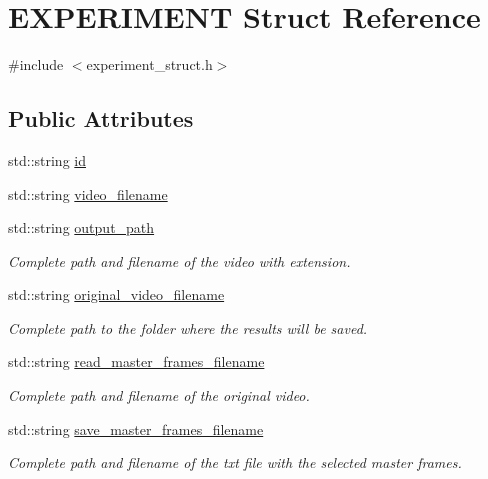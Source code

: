 \hypertarget{structEXPERIMENT}{}\section{E\+X\+P\+E\+R\+I\+M\+E\+NT Struct Reference}
\label{structEXPERIMENT}


{\ttfamily \#include $<$experiment\+\_\+struct.\+h$>$}

\subsection*{Public Attributes}
\begin{DoxyCompactItemize}
\item 
std\+::string \hyperlink{structEXPERIMENT_af59b6805fe0851b89d1300849db794e4}{id}
\item 
std\+::string \hyperlink{structEXPERIMENT_a7095f959a6d88f3a5997bcd0f4579609}{video\+\_\+filename}
\item 
std\+::string \hyperlink{structEXPERIMENT_a05ae2a5fbc8660bdb535937d4a446698}{output\+\_\+path}
\begin{DoxyCompactList}\small\item\em Complete path and filename of the video with extension. \end{DoxyCompactList}\item 
std\+::string \hyperlink{structEXPERIMENT_a3ce2700a31e4c1b808caceab4626ff06}{original\+\_\+video\+\_\+filename}
\begin{DoxyCompactList}\small\item\em Complete path to the folder where the results will be saved. \end{DoxyCompactList}\item 
std\+::string \hyperlink{structEXPERIMENT_a3412818ed24d2c956b01e1d6561d7b50}{read\+\_\+master\+\_\+frames\+\_\+filename}
\begin{DoxyCompactList}\small\item\em Complete path and filename of the original video. \end{DoxyCompactList}\item 
std\+::string \hyperlink{structEXPERIMENT_af3623d64105d92bec8a761c5318ec534}{save\+\_\+master\+\_\+frames\+\_\+filename}
\begin{DoxyCompactList}\small\item\em Complete path and filename of the txt file with the selected master frames. \end{DoxyCompactList}\item 

\end{DoxyCompactItemize}
